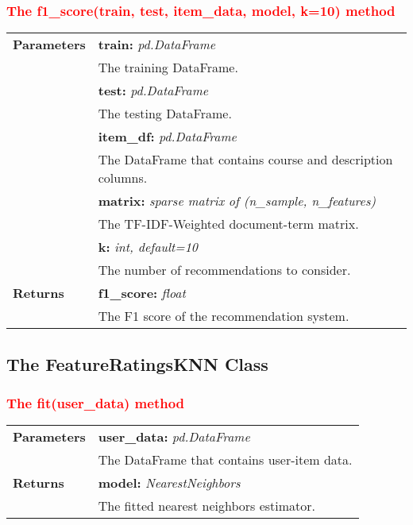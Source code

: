 \subsubsection{\textcolor{red}{The f1\_score(train, test, item\_data, model, k=10) method}}

\vspace{-7mm}
\begin{table}[H]
\small
\begin{tabularx}{\textwidth}{|p{2cm}|X|}
\hline
\textbf{Parameters} & \textbf{train:} \textit{pd.DataFrame} \\ & \hspace{5mm} The training DataFrame. \\
& \textbf{test:} \textit{pd.DataFrame} \\ & \hspace{5mm} The testing DataFrame. \\
& \textbf{item\_df:} \textit{pd.DataFrame} \\ & \hspace{5mm} The DataFrame that contains course and description columns. \\
& \textbf{matrix:} \textit{sparse matrix of (n\_sample, n\_features)} \\ & \hspace{5mm} The TF-IDF-Weighted document-term matrix. \\
& \textbf{k:} \textit{int, default=10} \\ & \hspace{5mm} The number of recommendations to consider. \\
\textbf{Returns} & \textbf{f1\_score:} \textit{float} \\ & \hspace{5mm} The F1 score of the recommendation system. \\
\hline
\end{tabularx}
\end{table}

\subsection{The FeatureRatingsKNN Class}

\subsubsection{\textcolor{red}{The fit(user\_data) method}}

\vspace{-7mm}
\begin{table}[H]
\small
\begin{tabularx}{\textwidth}{|p{2cm}|X|}
\hline
\textbf{Parameters} & \textbf{user\_data:} \textit{pd.DataFrame} \\ & \hspace{5mm} The DataFrame that contains user-item data. \\
\textbf{Returns} & \textbf{model:} \textit{NearestNeighbors} \\ & \hspace{5mm} The fitted nearest neighbors estimator. \\
\hline
\end{tabularx}
\end{table}

